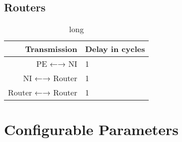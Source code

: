 \subsection{Routers}

\begin{table}
    \centering
    \begin{tabulary}{\textwidth}{R|L}
        Transmission & Delay in cycles \\\hline
        PE ←→ NI & 1 \\
        NI ←→ Router & 1 \\
        Router ←→ Router & 1
    \end{tabulary}
    \caption[short]{long}
    \label{tab:transmissionlatencies}
\end{table}

\section{Configurable Parameters}

